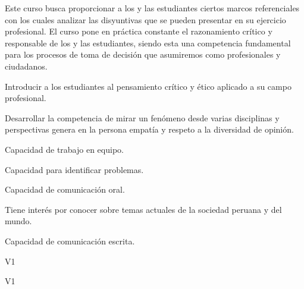 \begin{syllabus}


\begin{justification}
Este curso busca proporcionar a los y las estudiantes ciertos marcos referenciales con los cuales analizar las disyuntivas que se pueden presentar en su ejercicio profesional. 
El curso pone en práctica constante el razonamiento crítico y responsable de los  y las estudiantes, siendo esta una competencia fundamental para los procesos de toma de decisión que asumiremos como profesionales y ciudadanos.
\end{justification}
\begin{goals}
\item Introducir a los estudiantes al pensamiento crítico y ético aplicado a su campo profesional.
\item Desarrollar la competencia de mirar un fenómeno desde varias disciplinas y perspectivas genera en la persona empatía y respeto a la diversidad de opinión.
\item Capacidad de trabajo en equipo.
\item Capacidad para identificar problemas.
\item Capacidad de comunicación oral.
\item Tiene interés por conocer sobre temas actuales de la sociedad peruana y del mundo.
\item Capacidad de comunicación escrita.
\end{goals}

\begin{outcomes}{V1}
    \item {}
    \item {}
    \item {}
    \item {}
    \item {}
\end{outcomes}

\begin{competences}{V1}
    \item {}
    \item {}
    \item {}
    \item {}
\end{competences}


\end{syllabus}
